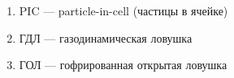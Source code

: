 \Abbreviations
\begin{enumerate}
	\item PIC --- particle-in-cell (частицы в ячейке)
	\item ГДЛ --- газодинамическая ловушка
	\item ГОЛ --- гофрированная открытая ловушка
\end{enumerate}